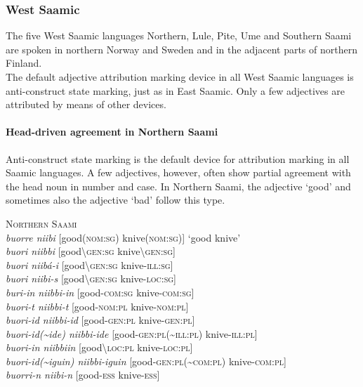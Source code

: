 \subsubsection{West Saamic}
The five West Saamic languages Northern, Lule, Pite, Ume and Southern Saami are spoken in northern Norway and Sweden and in the adjacent parts of northern Finland.\\

\noindent The default adjective attribution marking device in all West Saamic languages is anti-construct state marking, just as in East Saamic. Only a few adjectives are attributed by means of other devices.%

\paragraph{Head-driven agreement in Northern Saami}
Anti-construct state marking is the default device for attribution marking in all Saamic languages. A few adjectives, however, often show partial agreement with the head noun in number and case. In Northern Saami, the adjective ‘good’ and sometimes also the adjective ‘bad’ follow this type.
\begin{exe}
\ex \textsc{Northern Saami} \citep[83]{nickel1990}\\
\textit{buorre niibi} [good(\textsc{nom:sg}) knive(\textsc{nom:sg})] ‘good knive’\\
\textit{buori niibbi} [good\textbackslash\textsc{gen:sg} knive\textbackslash\textsc{gen:sg}]\\
\textit{buori niibá-i} [good\textbackslash\textsc{gen:sg} knive-\textsc{ill:sg}]\\
\textit{buori niibi-s} [good\textbackslash\textsc{gen:sg} knive-\textsc{loc:sg}]\\
\textit{buri-in niibbi-in} [good-\textsc{com:sg} knive-\textsc{com:sg}]\\
\textit{buori-t niibbi-t} [good-\textsc{nom:pl} knive-\textsc{nom:pl}]\\
\textit{buori-id niibbi-id} [good-\textsc{gen:pl} knive-\textsc{gen:pl}]\\
\textit{buori-id(\textasciitilde ide) niibbi-ide} [good-\textsc{gen:pl}(\textasciitilde \textsc{ill:pl}) knive-\textsc{ill:pl}]\\
\textit{buori-in niibbiin} [good\textbackslash\textsc{loc:pl} knive-\textsc{loc:pl}]\\
\textit{buori-id(\textasciitilde iguin) niibbi-iguin} [good-\textsc{gen:pl}(\textasciitilde \textsc{com:pl}) knive-\textsc{com:pl}]\\
\textit{buorri-n niibi-n} [good-\textsc{ess} knive-\textsc{ess}]
\end{exe}


